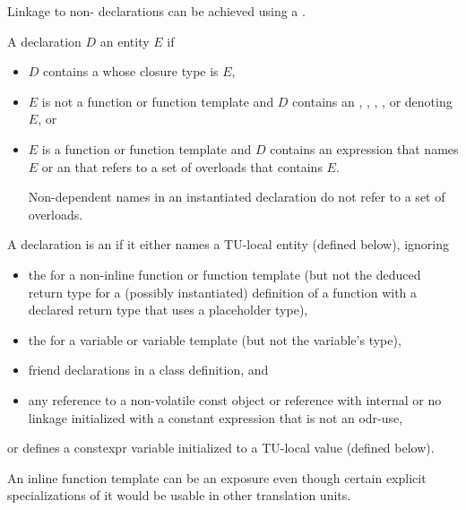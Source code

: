\pnum
\begin{note}
Linkage to non-\Cpp{} declarations can be achieved using a
.
\end{note}

\pnum
A declaration $D$  an entity $E$ if
\begin{itemize}
\item
$D$ contains a  whose closure type is $E$,
\item
$E$ is not a function or function template and $D$ contains an
,
,
,
, or
denoting $E$, or
\item
$E$ is a function or function template and
$D$ contains an expression that names $E$ or
an 
that refers to a set of overloads that contains $E$.
\begin{note}
Non-dependent names in an instantiated declaration
do not refer to a set of overloads.
\end{note}
\end{itemize}

\pnum
A declaration is an 
if it either names a TU-local entity (defined below), ignoring
\begin{itemize}
\item
the 
for a non-inline function or function template
(but not the deduced return type
for a (possibly instantiated) definition of a function
with a declared return type that uses a placeholder type),
\item
the 
for a variable or variable template (but not the variable's type),
\item
friend declarations in a class definition, and
\item
any reference to a non-volatile const object or reference
with internal or no linkage initialized with a constant expression
that is not an odr-use,
\end{itemize}
or defines a constexpr variable initialized to a TU-local value (defined below).
\begin{note}
An inline function template can be an exposure even though
certain explicit specializations of it would be usable in other translation units.
\end{note}

